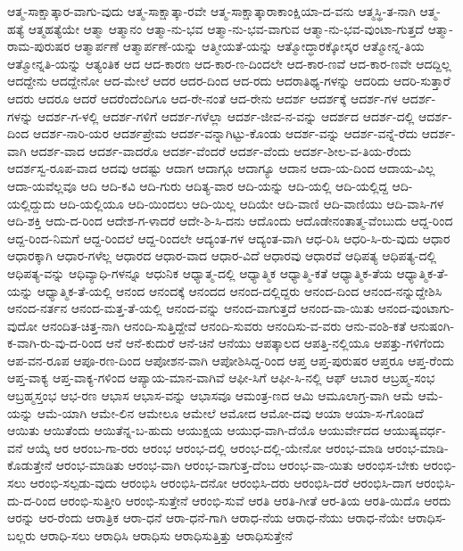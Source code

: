 ಆತ್ಮ-ಸಾಕ್ಷಾತ್ಕಾರ-ವಾಗು-ವುದು
ಆತ್ಮ-ಸಾಕ್ಷಾತ್ಕಾ-ರವೇ
ಆತ್ಮ-ಸಾಕ್ಷಾತ್ಕಾರಾಕಾಂಕ್ಷಿಯಾ-ದ-ವನು
ಆತ್ಮಸ್ಥಿ-ತ-ನಾಗಿ
ಆತ್ಮ-ಹತ್ಯೆ
ಆತ್ಮಹತ್ಯೆಯೇ
ಆತ್ಮಾ
ಆತ್ಮಾನಂ
ಆತ್ಮಾ-ನು-ಭವ
ಆತ್ಮಾ-ನು-ಭವ-ವಾಗುವ
ಆತ್ಮಾ-ನು-ಭವ-ವುಂಟಾ-ಗುತ್ತದೆ
ಆತ್ಮಾ-ರಾಮ-ಪುರುಷರ
ಆತ್ಮಾರ್ಪಣೆ
ಆತ್ಮಾರ್ಪಣೆ-ಯನ್ನು
ಆತ್ಮೀಯತೆ-ಯನ್ನು
ಆತ್ಮೋದ್ಧಾರಕ್ಕೋಸ್ಕರ
ಆತ್ಮೋನ್ನ-ತಿಯ
ಆತ್ಮೋನ್ನತಿ-ಯನ್ನು
ಆತ್ಯಂತಿಕ
ಆದ
ಆದ-ಕಾರಣ
ಆದ-ಕಾರ-ಣ-ದಿಂದಲೇ
ಆದ-ಕಾರ-ಣವೆ
ಆದ-ಕಾರ-ಣವೇ
ಆದದ್ದಿಲ್ಲ
ಆದದ್ದೇನು
ಆದದ್ದೇನೋ
ಆದ-ಮೇಲೆ
ಆದರ
ಆದರ-ದಿಂದ
ಆದ-ರದು
ಆದರಾತಿಥ್ಯ-ಗಳನ್ನು
ಆದರಿದು
ಆದರಿ-ಸುತ್ತಾರೆ
ಆದರು
ಆದರೂ
ಆದರೆ
ಆದರೆಂದೆಂದಿಗೂ
ಆದ-ರೇ-ನಂತೆ
ಆದ-ರೇನು
ಆದರ್ಶ
ಆದರ್ಶಕ್ಕೆ
ಆದರ್ಶ-ಗಳ
ಆದರ್ಶ-ಗಳನ್ನು
ಆದರ್ಶ-ಗ-ಳಲ್ಲಿ
ಆದರ್ಶ-ಗಳಿಗೆ
ಆದರ್ಶ-ಗಳೆಲ್ಲಾ
ಆದರ್ಶ-ಜೀವ-ನ-ವನ್ನು
ಆದರ್ಶದ
ಆದರ್ಶ-ದಲ್ಲಿ
ಆದರ್ಶ-ದಿಂದ
ಆದರ್ಶ-ನಾರಿ-ಯರ
ಆದರ್ಶಪ್ರೇಮ
ಆದರ್ಶ-ವನ್ನಾಗಿಟ್ಟು-ಕೊಂಡು
ಆದರ್ಶ-ವನ್ನು
ಆದರ್ಶ-ವನ್ನೆ-ರೆದು
ಆದರ್ಶ-ವಾಗಿ
ಆದರ್ಶ-ವಾದ
ಆದರ್ಶ-ವಾದರೊ
ಆದರ್ಶ-ವೆಂದರೆ
ಆದರ್ಶ-ವೆಂದು
ಆದರ್ಶ-ಶೀಲ-ವ-ತಿಯ-ರೆಂದು
ಆದರ್ಶಸ್ವ-ರೂಪ-ವಾದ
ಆದವು
ಆದಷ್ಟು
ಆದಾಗ
ಆದಾಗ್ಗೂ
ಆದಾಗ್ಯೂ
ಆದಾನ
ಆದಾ-ಯ-ದಿಂದ
ಆದಾಯ-ವಿಲ್ಲ
ಆದಾ-ಯವೆಲ್ಲವೂ
ಆದಿ
ಆದಿ-ಕವಿ
ಆದಿ-ಗುರು
ಆದಿತ್ಯ-ವಾರ
ಆದಿ-ಯನ್ನು
ಆದಿ-ಯಲ್ಲಿ
ಆದಿ-ಯಲ್ಲಿದ್ದ
ಆದಿ-ಯಲ್ಲಿದ್ದುದು
ಆದಿ-ಯಲ್ಲಿಯೂ
ಆದಿ-ಯಿಂದಲು
ಆದಿ-ಯಿಲ್ಲ
ಆದಿಯೇ
ಆದಿ-ವಾಣಿ
ಆದಿ-ವಾಣಿಯು
ಆದಿ-ವಾಸಿ-ಗಳ
ಆದಿ-ಶಕ್ತಿ
ಆದು-ದ-ರಿಂದ
ಆದೇಶ-ಗ-ಳಾದರೆ
ಆದೇ-ಶಿ-ಸಿ-ದನು
ಆದೊಂದು
ಆದೊಡೇನಂತಾತ್ಮ-ವೆಂಬುದು
ಆದ್ದ-ರಿಂದ
ಆದ್ದ-ರಿಂದ-ನಿಮಗೆ
ಆದ್ದ-ರಿಂದಲೆ
ಆದ್ದ-ರಿಂದಲೇ
ಆದ್ಯಂತ-ಗಳ
ಆದ್ಯಂತ-ವಾಗಿ
ಆಧ-ರಿಸಿ
ಆಧರಿ-ಸಿ-ರು-ವುದು
ಆಧಾರ
ಆಧಾರಕ್ಕಾಗಿ
ಆಧಾರ-ಗಳೆಲ್ಲ
ಆಧಾರದ
ಆಧಾರ-ವಾದ
ಆಧಾರ-ವಿದೆ
ಆಧಾರವು
ಆಧಾರವೆ
ಆಧಿಪತ್ಯ
ಆಧಿಪತ್ಯ-ದಲ್ಲಿ
ಆಧಿಪತ್ಯ-ವನ್ನು
ಆಧಿವ್ಯಾಧಿ-ಗಳನ್ನೂ
ಆಧುನಿಕ
ಆಧ್ಯಾತ್ಮ-ದಲ್ಲಿ
ಆಧ್ಯಾತ್ಮಿಕ
ಆಧ್ಯಾತ್ಮಿ-ಕತೆ
ಆಧ್ಯಾತ್ಮಿಕ-ತೆಯ
ಆಧ್ಯಾತ್ಮಿಕ-ತೆ-ಯನ್ನು
ಆಧ್ಯಾತ್ಮಿಕ-ತೆ-ಯಲ್ಲಿ
ಆನಂದ
ಆನಂದಕ್ಕೆ
ಆನಂದದ
ಆನಂದ-ದಲ್ಲಿದ್ದರು
ಆನಂದ-ದಿಂದ
ಆನಂದ-ನನ್ನುದ್ದೇಶಿಸಿ
ಆನಂದ-ನರ್ತನ
ಆನಂದ-ಮತ್ತ-ತೆ-ಯಲ್ಲಿ
ಆನಂದ-ವನ್ನು
ಆನಂದ-ವಾಗುತ್ತದೆ
ಆನಂದ-ವಾ-ಯಿತು
ಆನಂದ-ವುಂಟಾಗು-ವುದೋ
ಆನಂದಿತ-ಚಿತ್ತ-ನಾಗಿ
ಆನಂದಿ-ಸುತ್ತಿದ್ದೇವೆ
ಆನಂದಿ-ಸುವರು
ಆನಂದಿಸು-ವ-ವರು
ಆನು-ವಂಶಿ-ಕತೆ
ಆನುಷಂಗಿ-ಕ-ವಾಗಿ-ರು-ವು-ದ-ರಿಂದ
ಆನೆ
ಆನೆ-ಕುದುರೆ
ಆನೆ-ಚಿನೆ
ಆನೆಯು
ಆಪತ್ಕಾಲದ
ಆಪತ್ತಿ-ನಲ್ಲಿಯೂ
ಆಪತ್ತು-ಗಳಿಗೆಂದು
ಆಪ-ವನ-ರೂಪ
ಆಪೂ-ರಣ-ದಿಂದ
ಆಪೋಶನ-ವಾಗಿ
ಆಪೋಶಿಸಿದ್ದ-ರಿಂದ
ಆಪ್ತ
ಆಪ್ತ-ಪುರುಷರ
ಆಪ್ತರೂ
ಆಪ್ತ-ರೆಂದು
ಆಪ್ತ-ವಾಕ್ಯ
ಆಪ್ತ-ವಾಕ್ಯ-ಗಳಿಂದ
ಆಪ್ಯಾಯ-ಮಾನ-ವಾಗಿವೆ
ಆಫೀ-ಸಿಗೆ
ಆಫೀ-ಸಿ-ನಲ್ಲಿ
ಆಫ್
ಆಬಾರ
ಆಬ್ರಹ್ಮ-ಸಂಭ
ಆಬ್ರಹ್ಮಸ್ತಂಭ
ಆಭ-ರಣ
ಆಭಾಸ
ಆಭಾಸ-ವನ್ನು
ಆಭಾಸವೂ
ಆಮಂತ್ರ-ಣದ
ಆಮಿ
ಆಮೂಲಾಗ್ರ-ವಾಗಿ
ಆಮೆ
ಆಮೆ-ಯನ್ನು
ಆಮೆ-ಯಾಗಿ
ಆಮೇ-ಲಿನ
ಆಮೇಲೂ
ಆಮೇಲೆ
ಆಮೋದ
ಆಮೋ-ದವು
ಆಯಾ
ಆಯಾ-ಸ-ಗೊಂಡಿದೆ
ಆಯಿತು
ಆಯಿತೆಂದು
ಆಯಿತೆನ್ನ-ಬ-ಹುದು
ಆಯುಕ್ಷಯ
ಆಯುಧ-ವಾಗಿ-ದೆಯೊ
ಆಯುರ್ವೇದದ
ಆಯುಷ್ಯವರ್ಧ-ವನೆ
ಆಯ್ಕೆ
ಆರ
ಆರಂಬ-ಗಾ-ರರು
ಆರಂಭ
ಆರಂಭ-ದಲ್ಲಿ
ಆರಂಭ-ದಲ್ಲಿ-ಯೇನೋ
ಆರಂಭ-ಮಾಡಿ
ಆರಂಭ-ಮಾಡಿ-ಕೊಡುತ್ತೇನೆ
ಆರಂಭ-ಮಾಡಿತು
ಆರಂಭ-ವಾಗಿ
ಆರಂಭ-ವಾಗುತ್ತ-ದೆಂಬ
ಆರಂಭ-ವಾ-ಯಿತು
ಆರಂಭಿಸ-ಬೇಕು
ಆರಂಭಿ-ಸಲು
ಆರಂಭಿ-ಸಲ್ಪಡು-ವುದು
ಆರಂಭಿಸಿ
ಆರಂಭಿಸಿ-ದನೋ
ಆರಂಭಿಸಿ-ದರು
ಆರಂಭಿಸಿ-ದರೆ
ಆರಂಭಿಸಿ-ದಾಗ
ಆರಂಭಿಸಿ-ದು-ದ-ರಿಂದ
ಆರಂಭಿ-ಸುತ್ತೀರಿ
ಆರಂಭಿ-ಸುತ್ತೇನೆ
ಆರಂಭಿ-ಸುವೆ
ಆರತಿ
ಆರತಿ-ಗೀತೆ
ಆರ-ತಿಯ
ಆರತಿ-ಯಿದೊ
ಆರದು
ಆರನ್ನು
ಆರ-ರೆಂದು
ಆರಾತ್ರಿಕ
ಆರಾ-ಧನೆ
ಆರಾ-ಧನೆ-ಗಾಗಿ
ಆರಾಧ-ನೆಯ
ಆರಾಧ-ನೆಯು
ಆರಾಧ-ನೆಯೇ
ಆರಾಧಿಸ-ಬಲ್ಲರು
ಆರಾಧಿ-ಸಲು
ಆರಾಧಿಸಿ
ಆರಾಧಿಸು
ಆರಾಧಿಸುತ್ತಿತ್ತು
ಆರಾಧಿಸುತ್ತೇನೆ
